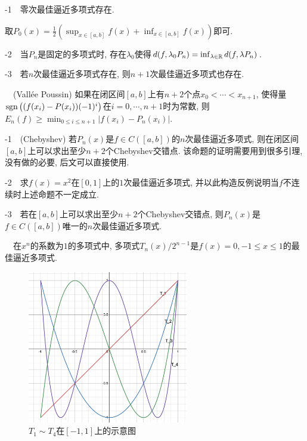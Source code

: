 -1~~零次最佳逼近多项式存在. 

\begin{exsolution}
	取$P_0(x)=\frac{1}{2}(\sup_{x \in [a,b]} f(x) + \inf_{x \in [a,b]} f(x))$即可. 
\end{exsolution}

-2~~当$P_n$是固定的多项式时, 存在$\lambda _0$使得$d(f,\lambda _0P_n) = \inf_{\lambda \in \mathbb{R}} d(f,\lambda P_n)$. 

-3~~若$n$次最佳逼近多项式存在, 则$n+1$次最佳逼近多项式也存在. 

~~(Vallée Poussin) 如果在闭区间$[a,b]$上有$n+2$个点$x_0 <\cdots <x_{n+1}$, 使得量$\operatorname{sgn} \big( (f(x_i)-P(x_i))(-1)^i \big)$在$i=0,\cdots ,n+1$时为常数, 则$E_n(f) \geq \min_{0 \leq i \leq n+1} |f(x_i)-P_n(x_i)|$. 
\vspace{1em}

-1~~(Chebyshev) 若$P_n(x)$是$f \in C([a,b])$的$n$次最佳逼近多项式, 则在闭区间$[a,b]$上可以求出至少$n+2$个Chebyshev交错点. {\color{blue}该命题的证明需要用到很多引理, 没有做的必要, 后文可以直接使用. }

-2~~求$f(x)=x^2$在$[0,1]$上的$1$次最佳逼近多项式, 并以此构造反例说明当$f$不连续时上述命题不一定成立. 

-3~~若在$[a,b]$上可以求出至少$n+2$个Chebyshev交错点, 则$P_n(x)$是$f \in C([a,b])${\color{blue}唯一}的$n$次最佳逼近多项式. 

~~在$x^n$的系数为$1$的多项式中, 多项式$T_n(x)/2^{n-1}$是$f(x)=0, -1 \leq x \leq 1$的最佳逼近多项式. 

\begin{figure}[H]
	\centering
	\includegraphics[width=7cm]{attachment/iShot_2024-02-01_18.43.57.png}
	\caption{$T_1 \sim T_4$在$[-1,1]$上的示意图}
\end{figure}







